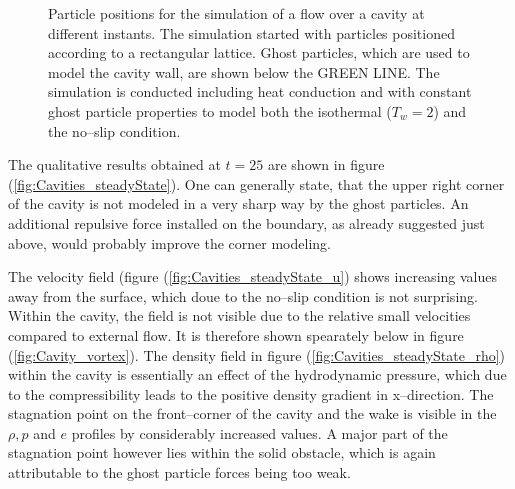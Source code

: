 \documentclass[11pt,a4paper,twoside]{report}
\begin{document}
\begin{figure}[!htbp]
{}

\caption[particle positions for Cavity]{Particle positions for the simulation of a flow over a cavity at different instants. The simulation started with particles positioned according to a rectangular lattice. Ghost particles, which are used to model the cavity wall, are shown below the GREEN LINE. The simulation is conducted including heat conduction and with constant ghost particle properties to model both the isothermal ($T_w=2$) and the no--slip condition.}

\end{figure}



The qualitative results obtained at $t=25$ are shown in figure (\ref{fig:Cavities_steadyState}). One can generally state, that the upper right corner of the cavity is not modeled in a very sharp way by the ghost particles. An additional repulsive force installed on the boundary, as already suggested just above, would probably improve the corner modeling. 

The velocity field (figure (\ref{fig:Cavities_steadyState_u}) shows increasing values away from the surface, which doue to the no--slip condition is not surprising. Within the cavity, the field is not visible due to the relative small velocities compared to external flow. It is therefore shown spearately below in figure (\ref{fig:Cavity_vortex}). The density field in figure (\ref{fig:Cavities_steadyState_rho}) within the cavity is essentially an effect of the hydrodynamic pressure, which due to the compressibility leads to the positive density gradient in x--direction. The stagnation point on the front--corner of the cavity and the wake is visible in the $\rho, p$ and $e$ profiles by considerably increased values. A major part of the stagnation point however lies within the solid obstacle, which is again attributable to the ghost particle forces being too weak.
\end{document}

